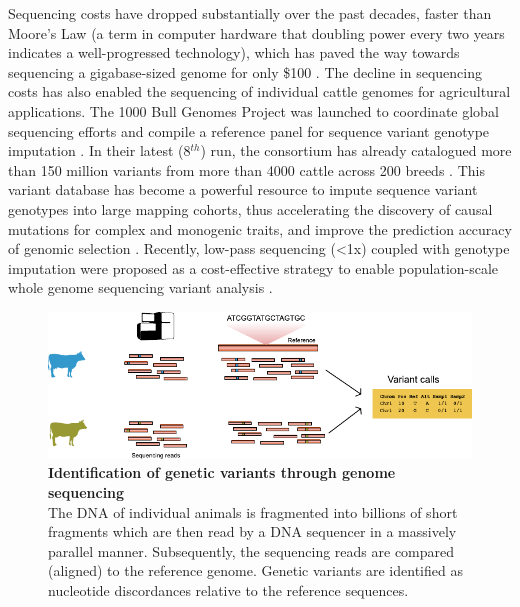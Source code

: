 \documentclass[../main.tex]{subfiles}
\begin{document}
Sequencing costs have dropped substantially over the past decades, faster than Moore’s Law (a term in computer hardware that doubling power every two years indicates a well-progressed technology), which has paved the way towards sequencing a gigabase-sized genome for only \$100 \citep{Regalado2020,Wetterstrand2020}. The decline in sequencing costs has also enabled the sequencing of individual cattle genomes for agricultural applications. The 1000 Bull Genomes Project was launched to coordinate global sequencing efforts and compile a reference panel for sequence variant genotype imputation \citep{daetwyler2014whole}. In their latest  (8$^{th}$) run, the consortium has already catalogued more than 150 million variants from more than 4000 cattle across 200 breeds \citep{hayes20191000}. This variant database has become a powerful resource to impute sequence variant genotypes into large mapping cohorts, thus accelerating the discovery of causal mutations for complex and monogenic traits, and improve the prediction accuracy of genomic selection \citep{daetwyler2014whole}. Recently, low-pass sequencing (<1x) coupled with genotype imputation were proposed as a cost-effective strategy to enable population-scale whole genome sequencing variant analysis \citep{snelling2020assessment}. \\

\bigskip

\begin{figure}[!htb]
    \centering
    \includegraphics[width=\textwidth]{intro/fig1.pdf}
        \vspace{3mm}
        \caption[Identification of genetic variants through genome sequencing]{\textbf{Identification of genetic variants through genome sequencing} \\
        \footnotesize{The DNA of individual animals is fragmented into billions of short fragments which are then read by a DNA sequencer in a massively parallel manner. Subsequently, the sequencing reads are compared (aligned) to the reference genome. Genetic variants are identified as nucleotide discordances relative to the reference sequences.}}
        \label{fig11:reseq}
\end{figure}
\end{document}
